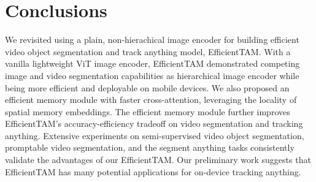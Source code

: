 \vspace{-1mm}
\section{Conclusions}
\vspace{-1mm}
We revisited using a plain, non-hierachical image encoder for building efficient video object segmentation and track anything model, EfficientTAM. With a vanilla lightweight ViT image encoder, EfficientTAM demonstrated competing image and video segmentation capabilities as hierarchical image encoder while being more efficient and deployable on mobile devices. We also proposed an efficient memory module with faster cross-attention, leveraging the locality of spatial memory embeddings. The efficient memory module further improves EfficientTAM's accuracy-efficiency tradeoff on video segmentation and tracking anything. Extensive experiments on semi-supervised video object segmentation, promptable video segmentation, and the segment anything tasks consistently validate the advantages of our EfficientTAM. Our preliminary work suggests that EfficientTAM has many potential applications for on-device tracking anything.